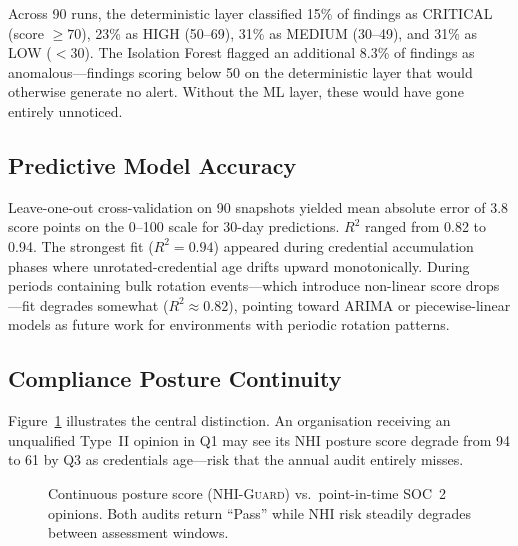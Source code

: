 \documentclass[journal]{IEEEtran}
\begin{document}
Across 90 runs, the deterministic layer classified 15\% of findings as CRITICAL (score $\geq 70$), 23\% as HIGH (50--69), 31\% as MEDIUM (30--49), and 31\% as LOW ($< 30$). The Isolation Forest flagged an additional 8.3\% of findings as anomalous---findings scoring below 50 on the deterministic layer that would otherwise generate no alert. Without the ML layer, these would have gone entirely unnoticed.

\subsection{Predictive Model Accuracy}

Leave-one-out cross-validation on 90 snapshots yielded mean absolute error of 3.8 score points on the 0--100 scale for 30-day predictions. $R^2$ ranged from 0.82 to 0.94. The strongest fit ($R^2 = 0.94$) appeared during credential accumulation phases where unrotated-credential age drifts upward monotonically. During periods containing bulk rotation events---which introduce non-linear score drops---fit degrades somewhat ($R^2 \approx 0.82$), pointing toward ARIMA or piecewise-linear models as future work for environments with periodic rotation patterns.

\subsection{Compliance Posture Continuity}

Figure~\ref{fig:posture} illustrates the central distinction. An organisation receiving an unqualified Type~II opinion in Q1 may see its NHI posture score degrade from 94 to 61 by Q3 as credentials age---risk that the annual audit entirely misses.

\begin{figure}[t]
  \centering
  \caption{Continuous posture score (\textsc{NHI-Guard}) vs.\ point-in-time SOC~2 opinions. Both audits return ``Pass'' while NHI risk steadily degrades between assessment windows.}
  \label{fig:posture}
\end{figure}
\end{document}
